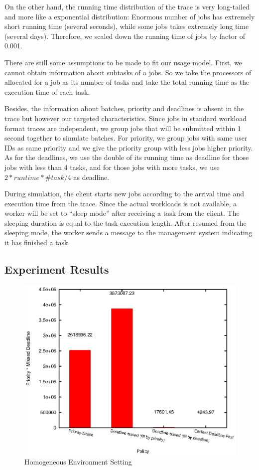 On the other hand, the running time distribution of the trace is very
long-tailed and more like a exponential distribution: Enormous number of
jobs has extremely short running time (several seconds), while some jobs
takes extremely long time (several days).
Therefore, we scaled down the running time of jobs by factor of 0.001.

There are still some assumptions to be made to fit our usage model.
First, we cannot obtain information about subtasks of a jobs.
So we take the processors of allocated for a job as its number of tasks
and take the total running time as the execution time of each task.

Besides, the information about batches, priority and deadlines is absent
in the trace but however our targeted characteristics.
Since jobs in standard workload format traces are independent,
we group jobs that will be submitted within 1 second together to
simulate batches.
For priority, we group jobs with same user IDs as same priority and we
give the priority group with less jobs higher priority.
As for the deadlines, we use the double of its running time as deadline
for those jobs with less than 4 tasks, and for those jobs with more
tasks, we use $2 * runtime * \#task / 4$ as deadline.

During simulation, the client starts new jobs according to the arrival
time and execution time from the trace.
Since the actual workloads is not available, a worker will be set to
``sleep mode'' after receiving a task from the client.
The sleeping duration is equal to the task execution length.
After resumed from the sleeping mode, the worker sends a message to the
management system indicating it has finished a task.

\subsection{Experiment Results}
\begin{figure}[htbp]
  \centering
  \includegraphics[width=\textwidth,height=0.7\textheight,keepaspectratio]{figures/homo.eps}
  \caption{Homogeneous Environment Setting}
  \label{fig:homo-result}
\end{figure}

